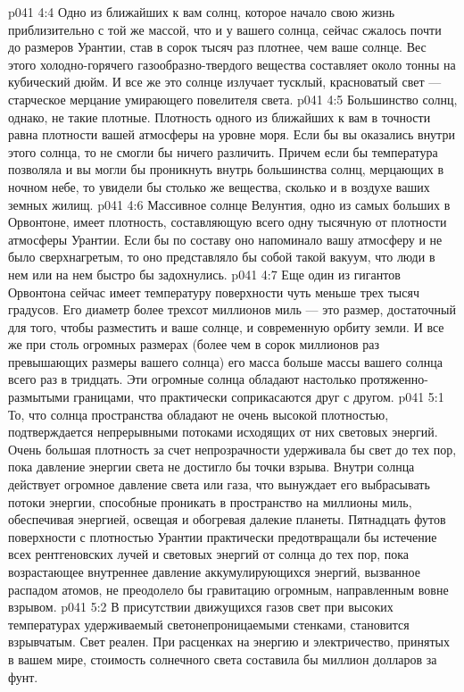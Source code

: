 \vs p041 4:4 Одно из ближайших к вам солнц, которое начало свою жизнь приблизительно с той же массой, что и у вашего солнца, сейчас сжалось почти до размеров Урантии, став в сорок тысяч раз плотнее, чем ваше солнце. Вес этого холодно\hyp{}горячего газообразно\hyp{}твердого вещества составляет около тонны на кубический дюйм. И все же это солнце излучает тусклый, красноватый свет --- старческое мерцание умирающего повелителя света.
\vs p041 4:5 Большинство солнц, однако, не такие плотные. Плотность одного из ближайших к вам в точности равна плотности вашей атмосферы на уровне моря. Если бы вы оказались внутри этого солнца, то не смогли бы ничего различить. Причем если бы температура позволяла и вы могли бы проникнуть внутрь большинства солнц, мерцающих в ночном небе, то увидели бы столько же вещества, сколько и в воздухе ваших земных жилищ.
\vs p041 4:6 Массивное солнце Велунтия, одно из самых больших в Орвонтоне, имеет плотность, составляющую всего одну тысячную от плотности атмосферы Урантии. Если бы по составу оно напоминало вашу атмосферу и не было сверхнагретым, то оно представляло бы собой такой вакуум, что люди в нем или на нем быстро бы задохнулись.
\vs p041 4:7 Еще один из гигантов Орвонтона сейчас имеет температуру поверхности чуть меньше трех тысяч градусов. Его диаметр более трехсот миллионов миль --- это размер, достаточный для того, чтобы разместить и ваше солнце, и современную орбиту земли. И все же при столь огромных размерах (более чем в сорок миллионов раз превышающих размеры вашего солнца) его масса больше массы вашего солнца всего раз в тридцать. Эти огромные солнца обладают настолько протяженно\hyp{}размытыми границами, что практически соприкасаются друг с другом.
\vs p041 5:1 То, что солнца пространства обладают не очень высокой плотностью, подтверждается непрерывными потоками исходящих от них световых энергий. Очень большая плотность за счет непрозрачности удерживала бы свет до тех пор, пока давление энергии света не достигло бы точки взрыва. Внутри солнца действует огромное давление света или газа, что вынуждает его выбрасывать потоки энергии, способные проникать в пространство на миллионы миль, обеспечивая энергией, освещая и обогревая далекие планеты. Пятнадцать футов поверхности с плотностью Урантии практически предотвращали бы истечение всех рентгеновских лучей и световых энергий от солнца до тех пор, пока возрастающее внутреннее давление аккумулирующихся энергий, вызванное распадом атомов, не преодолело бы гравитацию огромным, направленным вовне взрывом.
\vs p041 5:2 В присутствии движущихся газов свет при высоких температурах удерживаемый светонепроницаемыми стенками, становится взрывчатым. Свет реален. При расценках на энергию и электричество, принятых в вашем мире, стоимость солнечного света составила бы миллион долларов за фунт.
